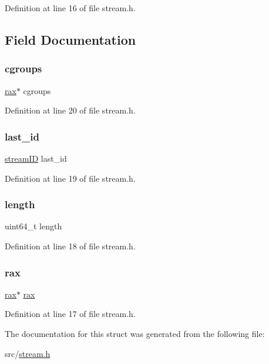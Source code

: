 Definition at line 16 of file stream.\+h.



\subsection{Field Documentation}
\mbox{\label{structstream_a16c7dae1e1c61411ffe37afabe67de80}} 
\subsubsection{\texorpdfstring{cgroups}{cgroups}}
{\footnotesize\ttfamily \hyperlink{structrax}{rax}$\ast$ cgroups}



Definition at line 20 of file stream.\+h.

\mbox{\label{structstream_aaa32df2db581ba299a258cdc0db8e907}} 
\subsubsection{\texorpdfstring{last\+\_\+id}{last\_id}}
{\footnotesize\ttfamily \hyperlink{structstream_i_d}{stream\+ID} last\+\_\+id}



Definition at line 19 of file stream.\+h.

\mbox{\label{structstream_a190b76b1f3d5bd26920300e5f073739b}} 
\subsubsection{\texorpdfstring{length}{length}}
{\footnotesize\ttfamily uint64\+\_\+t length}



Definition at line 18 of file stream.\+h.

\mbox{\label{structstream_a5e94d4d7ba0112aeda6ee7b1ec15cf54}} 
\subsubsection{\texorpdfstring{rax}{rax}}
{\footnotesize\ttfamily \hyperlink{structrax}{rax}$\ast$ \hyperlink{structrax}{rax}}



Definition at line 17 of file stream.\+h.



The documentation for this struct was generated from the following file\+:\begin{DoxyCompactItemize}
\item 
src/\hyperlink{stream_8h}{stream.\+h}\end{DoxyCompactItemize}
